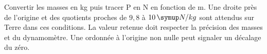 \par\noindent\begin{minipage}{\linewidth}
\label{cor-activite-11}
Convertir les masses en kg puis tracer P en N en fonction de m. Une droite près de l’origine et des quotients proches de $9{,}8$ à $10\unite{N/kg}$ sont attendus sur Terre dans ces conditions. La valeur retenue doit respecter la précision des masses et du dynamomètre. Une ordonnée à l’origine non nulle peut signaler un décalage du zéro.\par\end{minipage}
